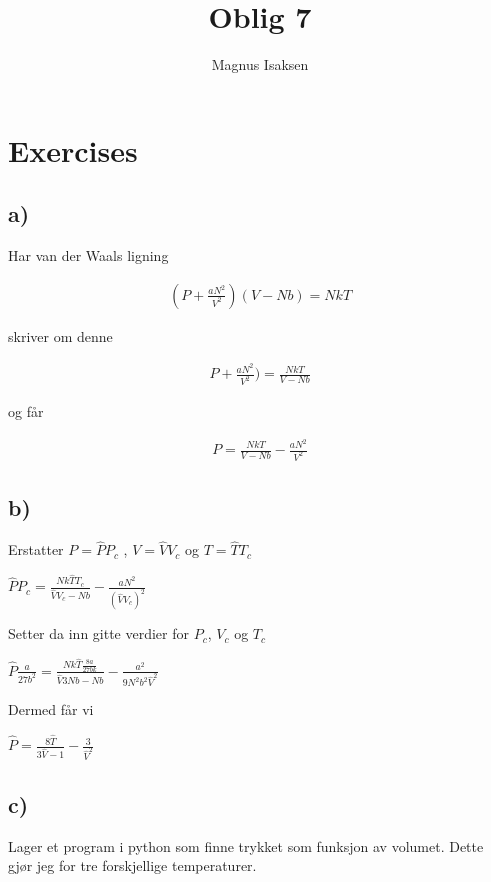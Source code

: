 \documentclass[12pt]{article}
\begin{document}
\title{Oblig 7}
\author{Magnus Isaksen}
\maketitle
\newpage 

\section*{Exercises}

\subsection*{a)}

Har van der Waals ligning 

\begin{align*}
(P + \frac{aN^2}{V^2}) (V - Nb) = NkT
\end{align*}

skriver om denne 

\begin{align*}
P + \frac{aN^2}{V^2}) = \frac{NkT}{V-Nb}
\end{align*}

og får 

\begin{align*}
P = \frac{NkT}{V-Nb} - \frac{aN^2}{V^2}
\end{align*}


\subsection*{b)}

Erstatter $P = \hat{P}P_c$ , $V = \hat{V}V_c$ og $T = \hat{T}T_c$


$\hat{P}P_c = \frac{Nk\hat{T}T_c}{\hat{V}V_c - Nb} - \frac{aN^2}{(\hat{V}V_c)^2}$


Setter da inn gitte verdier for $P_c$, $V_c$ og $T_c$

$\hat{P}\frac{a}{27b^2} = \frac{Nk\hat{T} \frac{8a}{27bk}}{\hat{V}3Nb - Nb} - \frac{a^2}{9N^2b^2\hat{V}^2}$

Dermed får vi 

$\hat{P} = \frac{8\hat{T}}{3\hat{V} - 1} - \frac{3}{\hat{V}^2}$

\subsection*{c)}

Lager et program i python som finne trykket som funksjon av volumet. Dette gjør jeg for tre forskjellige temperaturer. 
\end{document}
